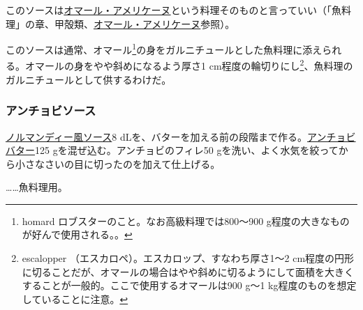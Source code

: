 \begin{recette}
このソースは\protect\hyperlink{homard-americaine}{オマール・アメリケーヌ}という料理そのものと言っていい（「魚料理」の章、甲殻類、\protect\hyperlink{homard-americaine}{オマール・アメリケーヌ}参照）。

このソースは通常、オマール\footnote{homard
  ロブスターのこと。なお高級料理では800〜900
  g程度の大きなものが好んで使用される。。}の身をガルニチュールとした魚料理に添えられる。オマールの身をやや斜めになるよう厚さ1
cm程度の輪切りにし\footnote{escalopper
  （エスカロペ）。エスカロップ、すなわち厚さ1〜2
  cm程度の円形に切ることだが、オマールの場合はやや斜めに切るようにして面積を大きくすることが一般的。ここで使用するオマールは900
  g〜1 kg程度のものを想定していることに注意。}、魚料理のガルニチュールとして供するわけだ。

\atoaki{}

\hypertarget{sauce-anchois}{%
\subsubsection{アンチョビソース}\label{sauce-anchois}}


 

\href{}{ノルマンディー風ソース}8
dLを、バターを加える前の段階まで作る。\href{}{アンチョビバター}125
gを混ぜ込む。アンチョビのフィレ50
gを洗い、よく水気を絞ってから小さなさいの目に切ったのを加えて仕上げる。

\ldots{}\ldots{}魚料理用。

\atoaki{}

\hypertarget{sauce-aurore}{%
}
\end{recette}
